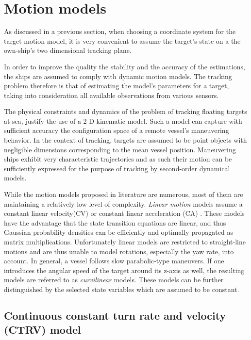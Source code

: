 \section{Motion models} \label{sec:MotionModels}

As discussed in a previous section, when choosing a coordinate system for the target motion model, it is very convenient to assume the target's state on a the own-ship's two dimensional tracking plane.



In order to improve the quality the stability and the accuracy of the estimations, the ships are assumed to comply with dynamic motion models. The tracking problem therefore is that of estimating the model's parameters for a target, taking into consideration all available observations from various sensors.


The physical constraints and dynamics of the problem of tracking floating targets at sea, justify the use of a 2-D kinematic model. Such a model can capture with sufficient accuracy the configuration space of a remote vessel's maneuvering behavior. In the context of tracking, targets are assumed to be point objects with negligible dimensions corresponding to the mean vessel position. Maneuvering ships exhibit very characteristic trajectories and as such their  motion can be sufficiently expressed for the purpose of tracking by second-order dynamical models.

While the motion models proposed in literature are numerous, most of them are maintaining a relatively low level of complexity. \emph{Linear motion} models assume a constant linear velocity(CV) or constant linear acceleration (CA) \cite{Schubert2008}. These models have the advantage that the state transition equations are linear, and thus Gaussian probability densities can be efficiently and optimally propagated as matrix multiplications. Unfortunately linear models are restricted to straight-line motions and are thus unable to model rotations, especially the yaw rate, into account. In general, a vessel follows slow parabolic-type maneuvers. If one introduces the angular speed of the target around its z-axis as well, the resulting models are referred to as \emph{curvilinear} models. These models can be further distinguished by the selected state variables which are assumed to be constant.

\subsection{Continuous constant turn rate and velocity (CTRV) model}


